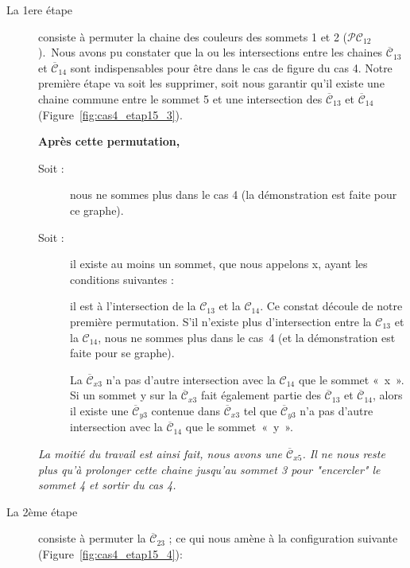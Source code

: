 \documentclass[french]{report}
\begin{document}
\begin{description}
\item [La 1ere étape] consiste à permuter la chaine des couleurs des sommets 1 et 2 ($\mathcal{PC}_{12}$).\
Nous avons pu constater que la ou les intersections entre les chaines $\overline{\mathcal{C}}_{13}$ et $\overline{\mathcal{C}}_{14}$ sont indispensables pour être dans le cas de figure du cas 4. Notre première étape va soit les supprimer, soit nous garantir qu'il existe une chaine commune entre le sommet 5 et une intersection des $\overline{\mathcal{C}}_{13}$ et $\overline{\mathcal{C}}_{14}$ (Figure~\ref{fig:cas4_etap15_3}).
	\begin{changemargin}{0cm}{0cm}

\textbf{Après cette permutation,}
\begin{description}
\item[Soit :] nous ne sommes plus dans le cas 4 (la démonstration est faite pour ce graphe).
\item[Soit :] il existe au moins un sommet, que nous appelons x, ayant les conditions suivantes :\\
\item[]il est à l’intersection de la $\mathcal{C}_{13}$ et la $\mathcal{C}_{14}$.
Ce constat découle de notre première permutation. S’il n’existe plus d’intersection entre la $\mathcal{C}_{13}$ et la $\mathcal{C}_{14}$, nous ne sommes plus dans le cas~4 (et la démonstration est faite pour se graphe).\\
\item[]La $\overline{\mathcal{C}}_{x3}$ n’a pas d’autre intersection avec la $\mathcal{C}_{14}$ que le sommet «~x~».\\
Si un sommet y sur la $\overline{\mathcal{C}}_{x3}$ fait également partie des $\overline{\mathcal{C}}_{13}$ et $\overline{\mathcal{C}}_{14}$, alors il existe une $\overline{\mathcal{C}}_{y3}$ contenue dans $\overline{\mathcal{C}}_{x3}$ tel que $\overline{\mathcal{C}}_{y3}$ n'a pas d’autre intersection avec la $\overline{\mathcal{C}}_{14}$ que le sommet~«~y~».\\
\end{description}
	\end{changemargin}

\textit{La moitié du travail est ainsi fait, nous avons une $\overline{\mathcal{C}}_{x5}$. Il ne nous reste plus qu'à prolonger cette chaine jusqu'au sommet 3 pour "encercler" le sommet 4 et sortir du cas 4.}\\

\item [La 2ème étape] consiste à permuter la $\overline{\mathcal{C}}_{23}$ ; ce qui nous amène à la
configuration suivante (Figure~\ref{fig:cas4_etap15_4}):\


\end{description}
\end{document}
